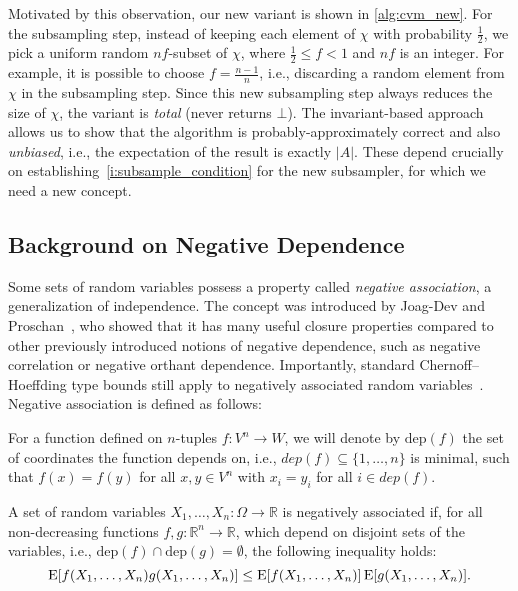 Motivated by this observation, our new variant is shown in \cref{alg:cvm_new}.
For the subsampling step, instead of keeping each element of $\chi$ with probability $\frac{1}{2}$, we pick a uniform random $nf$-subset of $\chi$, where $\frac{1}{2} \leq f < 1$ and $nf$ is an integer.
For example, it is possible to choose $f = \frac{n-1}{n}$, i.e., discarding a random element from $\chi$ in the subsampling step.
Since this new subsampling step always reduces the size of $\chi$, the variant is \emph{total} (never returns $\bot$).
The invariant-based approach allows us to show that the algorithm is probably-approximately correct and also \emph{unbiased}, i.e., the expectation of the result is exactly $|A|$.
These depend crucially on establishing~\cref{i:subsample_condition} for the new subsampler, for which we need a new concept.

\subsection{Background on Negative Dependence}
Some sets of random variables possess a property called \emph{negative association}, a generalization of independence.
The concept was introduced by Joag-Dev and Proschan~\cite{joagdev1983}, who showed that it has many useful closure properties compared to other previously introduced notions of negative dependence, such as negative correlation or negative orthant dependence. %
Importantly, standard Chernoff--Hoeffding type bounds still apply to negatively associated random variables~\cite[Prop. 7]{dubhashi1998}.
Negative association is defined as follows:
\begin{definition}
For a function defined on $n$-tuples $f: V^n \rightarrow W$, we will denote by $\mathrm{dep}(f)$ the set of coordinates the function depends on, i.e., $dep(f) \subseteq \{1,\ldots,n\}$ is minimal, such that $f(x) = f(y)$ for all $x, y \in V^n$ with $x_i = y_i$ for all $i \in dep(f)$.
\end{definition}

\begin{definition}\label{def:neg_assoc}
A set of random variables $X_1,\dots,X_n: \Omega \rightarrow \mathbb R$ is negatively associated if, for all non-decreasing functions $f,g: \mathbb R^n \rightarrow \mathbb R$, which depend on disjoint sets of the variables, i.e., $\mathrm{dep}(f) \cap \mathrm{dep}(g) = \emptyset$, the following inequality holds:
\[
\operatorname{\mathrm{E}} [f(X_1,\ldots,X_n) g(X_1,\ldots,X_n)] \leq \operatorname{\mathrm{E}} [f(X_1,\ldots,X_n)] \operatorname{\mathrm{E}} [g(X_1,\ldots,X_n)] \textrm{.}
\]
\end{definition}

